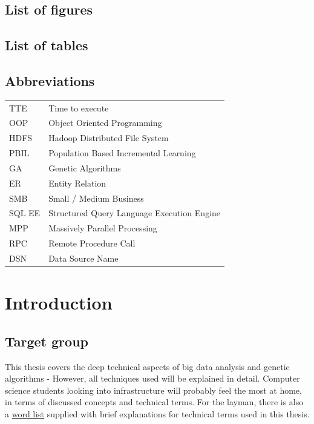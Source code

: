 \documentclass[a4paper,english]{report}
\begin{document}
	\section{List of figures}
	\section{List of tables}
	\section{Abbreviations}
	\label{word_list}
	\begin{table}[h]
		\centering
		\begin{tabular}{ll}
			TTE	& Time to execute \\
			OOP	& Object Oriented Programming \\
			HDFS & Hadoop Distributed File System \\
			PBIL & Population Based Incremental Learning \\
			GA & Genetic Algorithms \\
			ER & Entity Relation \\
			SMB & Small / Medium Business \\
			SQL EE & Structured Query Language Execution Engine \\
			MPP & Massively Parallel Processing \\
			RPC & Remote Procedure Call \\
			DSN & Data Source Name \\
		\end{tabular}
	\end{table}

	
	\chapter{Introduction}
		
		\section{Target group}
		This thesis covers the deep technical aspects of big data analysis and genetic algorithms - However, all techniques used will be explained in detail. Computer science students looking into infrastructure will probably feel the most at home, in terms of discussed concepts and technical terms. For the layman, there is also a \hyperref[word_list]{word list} supplied with brief explanations for technical terms used in this thesis.
		
\end{document}
